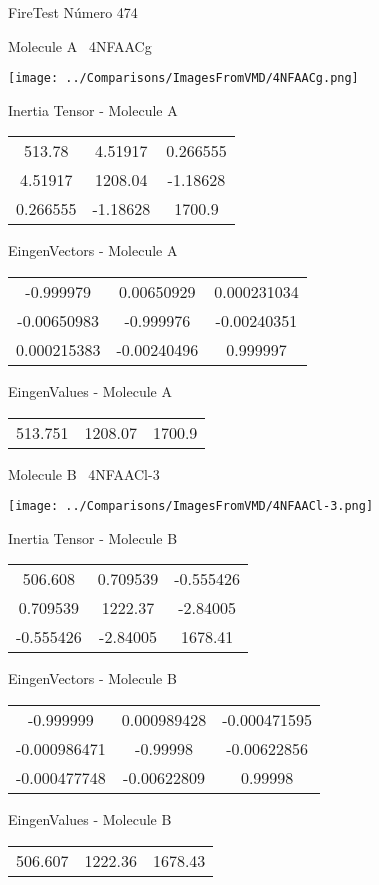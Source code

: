 \vtab[-3cm]
\begin{center}
{\large FireTest \tab Número 474}
\end{center}
\begin{multicols}{2}
\begin{center}

Molecule A \
4NFAACg

\texttt{[image: ../Comparisons/ImagesFromVMD/4NFAACg.png]}

Inertia Tensor - Molecule A \\
\begin{tabular}{|c c c|}
513.78	 & 	4.51917	 & 	0.266555	 \\
4.51917	 & 	1208.04	 & 	-1.18628	 \\
0.266555	 & 	-1.18628	 & 	1700.9
\end{tabular}

\vtab
 EingenVectors - Molecule A     \\
\begin{tabular}{|c c c|}
-0.999979	 & 	0.00650929	 & 	0.000231034	 \\
-0.00650983	 & 	-0.999976	 & 	-0.00240351	 \\
0.000215383	 & 	-0.00240496	 & 	0.999997
\end{tabular}

\vtab
 EingenValues - Molecule A     \\
\begin{tabular}{|c c c|}
513.751	 & 	1208.07	 & 	1700.9	 \\
\end{tabular}
\columnbreak

Molecule B \
4NFAACl-3

\texttt{[image: ../Comparisons/ImagesFromVMD/4NFAACl-3.png]}

Inertia Tensor - Molecule B \\
\begin{tabular}{|c c c|}
506.608	 & 	0.709539	 & 	-0.555426	 \\
0.709539	 & 	1222.37	 & 	-2.84005	 \\
-0.555426	 & 	-2.84005	 & 	1678.41
\end{tabular}

\vtab
 EingenVectors - Molecule B     \\
\begin{tabular}{|c c c|}
-0.999999	 & 	0.000989428	 & 	-0.000471595	 \\
-0.000986471	 & 	-0.99998	 & 	-0.00622856	 \\
-0.000477748	 & 	-0.00622809	 & 	0.99998
\end{tabular}

\vtab
 EingenValues - Molecule B     \\
\begin{tabular}{|c c c|}
506.607	 & 	1222.36	 & 	1678.43	 \\
\end{tabular}

\end{center}
\end{multicols}

